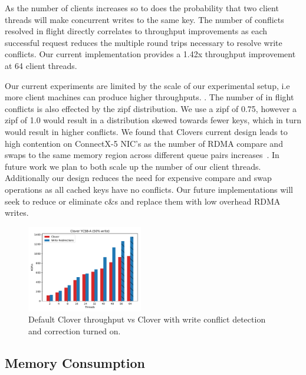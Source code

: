As the number of clients increases so to does the probability that two
client threads will make concurrent writes to the same key. The number
of conflicts resolved in flight directly correlates to throughput
improvements as each successful request reduces the multiple round
trips necessary to resolve write conflicts. Our current implementation
provides a 1.42x throughput improvement at 64 client threads.

Our current experiments are limited by the scale of our experimental
setup, i.e more client machines can produce higher throughputs.
. 
The number of in flight conflicts is also effected by the zipf
distribution. We use a zipf of 0.75, however a zipf of 1.0 would
result in a distribution skewed towards fewer keys, which in turn
would result in higher conflicts. We found that Clovers current design
leads to high contention on ConnectX-5 NIC's as the number of RDMA
compare and swaps to the same memory region across different queue
pairs increases~\cite{design-guidelines}. In future work we plan to
both scale up the number of our client threads. Additionally our
design reduces the need for expensive compare and swap operations as
all cached keys have no conflicts. Our future implementations will
seek to reduce or eliminate c\&s and replace them with low overhead
RDMA writes.

\begin{figure}
    \includegraphics[width=0.45\textwidth]{fig/throughput.pdf}
    \caption{Default Clover throughput vs Clover with write conflict
    detection and correction turned on.}
    \label{fig:throughput}
\end{figure}

\subsection{Memory Consumption}

